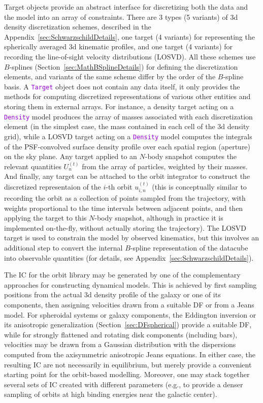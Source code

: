 \documentclass[12pt]{article}
\newcommand{\ttt}[1]{\textcolor{darkviolet}{\texttt{#1}}}
\begin{document}
Target objects provide an abstract interface for discretizing both the data and the model into an array of constraints. There are 3 types (5 variants) of 3d density discretization schemes, described in the Appendix~\ref{sec:SchwarzschildDetails}, one target (4 variants) for representing the spherically averaged 3d kinematic profiles, and one target (4 variants) for recording the line-of-sight velocity distributions (LOSVD). All these schemes use $B$-splines (Section~\ref{sec:MathBSplineDetails}) for defining the discretization elements, and variants of the same scheme differ by the order of the $B$-spline basis.
A \ttt{Target} object does not contain any data itself, it only provides the methods for computing discretized representations of various other entities and storing them in external arrays.
For instance, a density target acting on a \ttt{Density} model produces the array of masses associated with each discretization element (in the simplest case, the mass contained in each cell of the 3d density grid), while a LOSVD target acting on a \ttt{Density} model computes the integrals of the PSF-convolved surface density profile over each spatial region (aperture) on the sky plane. Any target applied to an $N$-body snapshot computes the relevant quantities $U_n^{(t)}$ from the array of particles, weighted by their masses. And finally, any target can be attached to the orbit integrator to construct the discretized representaion of the $i$-th orbit $u_{i,n}^{(t)}$ (this is conceptually similar to recording the orbit as a collection of points sampled from the trajectory, with weights proportional to the time intervals between adjacent points, and then applying the target to this $N$-body snapshot, although in practice it is implemented on-the-fly, without actually storing the trajectory). The LOSVD target is used to constrain the model by observed kinematics, but this involves an additional step to convert the internal $B$-spline representation of the datacube into observable quantities (for details, see Appendix~\ref{sec:SchwarzschildDetails}).

The IC for the orbit library may be generated by one of the complementary approaches for constructing dynamical models. This is achieved by first sampling positions from the actual 3d density profile of the galaxy or one of its components, then assigning velocities drawn from a suitable DF or from a Jeans model. For spheroidal systems or galaxy components, the Eddington inversion or its anisotropic generalization (Section~\ref{sec:DFspherical}) provide a suitable DF, while for strongly flattened and rotating disk components (including bars), velocities may be drawn from a Gaussian distribution with the dispersions computed from the axisymmetric anisotropic Jeans equations. In either case, the resulting IC are not necessarily in equilibrium, but merely provide a convenient starting point for the orbit-based modelling. Moreover, one may stack together several sets of IC created with different parameters (e.g., to provide a denser sampling of orbits at high binding energies near the galactic center).
\end{document}
